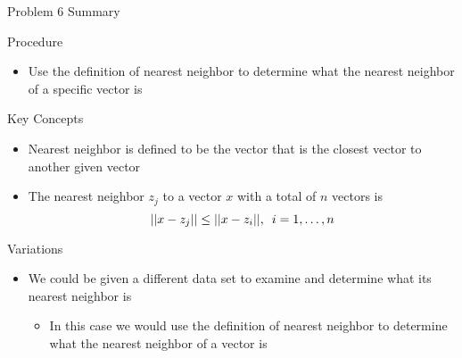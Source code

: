 \begin{summary}{Problem 6 Summary}
    \begin{statement}{Procedure}
        \begin{itemize}
            \item Use the definition of nearest neighbor to determine what the nearest neighbor of a specific vector is
        \end{itemize}
    \end{statement}
    \begin{statement}{Key Concepts}
        \begin{itemize}
            \item Nearest neighbor is defined to be the vector that is the closest vector to another given vector
            \item The nearest neighbor $z_{j}$ to a vector $x$ with a total of $n$ vectors is 
            \begin{equation*}
                ||x - z_{j}|| \leq ||x - z_{i}||, \hspace*{5pt} i = 1,\dots,n
            \end{equation*}
        \end{itemize}
    \end{statement}
    \begin{statement}{Variations}
        \begin{itemize}
            \item We could be given a different data set to examine and determine what its nearest neighbor is
            \begin{itemize}
                \item In this case we would use the definition of nearest neighbor to determine what the nearest neighbor of a vector is
            \end{itemize}
        \end{itemize}
    \end{statement}
\end{summary}

